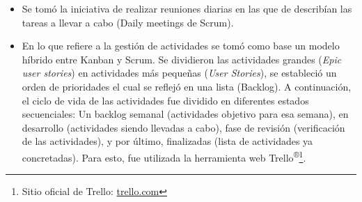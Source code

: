         \begin{itemize}
            \item Se tomó la iniciativa de realizar reuniones diarias en las que de describían las tareas a llevar a cabo (Daily meetings de Scrum).

            
            \item En lo que refiere a la gestión de actividades se tomó como base un modelo híbrido entre Kanban y Scrum. Se dividieron las actividades grandes (\textit{Epic user stories}) en actividades más pequeñas (\textit{User Stories}), se estableció un orden de prioridades el cual se reflejó en una lista (Backlog). A continuación, el ciclo de vida de las actividades fue dividido en diferentes estados secuenciales: Un backlog semanal (actividades objetivo para esa semana), en desarrollo (actividades siendo llevadas a cabo), fase de revisión (verificación de las actividades), y por último, finalizadas (lista de actividades ya concretadas). Para esto, fue utilizada la herramienta web Trello\textsuperscript{®}\footnote{ Sitio oficial de Trello: \url{trello.com}}.
            
        \end{itemize}
        
